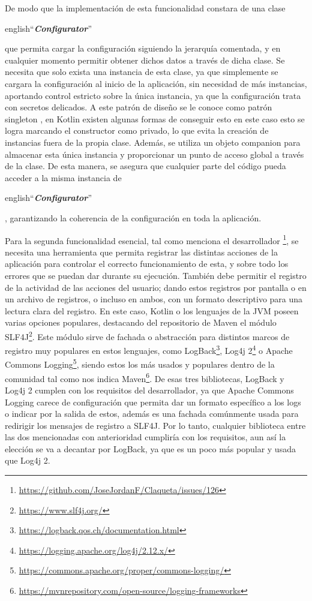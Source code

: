 De modo que la implementación de esta funcionalidad constara de una clase \begin{otherlanguage} {english}``\textit{\textbf{Configurator}}''\end{otherlanguage} 
que permita cargar la configuración siguiendo la jerarquía comentada, y en cualquier momento permitir obtener dichos datos a través 
de dicha clase. Se necesita que solo exista una instancia de esta clase, ya que simplemente se cargara la configuración al inicio de 
la aplicación, sin necesidad de más instancias, aportando control estricto sobre la única instancia, ya que la configuración
trata con secretos delicados. A este patrón de diseño se le conoce como patrón singleton \cite{PattSingl}, en Kotlin 
existen algunas formas de conseguir esto \cite{SinglKotlin} en este caso esto se logra marcando el constructor como 
privado, lo que evita la creación de instancias fuera de la propia clase. Además, se utiliza un objeto companion 
para almacenar esta única instancia y proporcionar un punto de acceso global a través de la clase. De esta manera, 
se asegura que cualquier parte del código pueda acceder a la misma instancia de \begin{otherlanguage} {english}``\textit{\textbf{Configurator}}''\end{otherlanguage}, 
garantizando la coherencia de la configuración en toda la aplicación.

Para la segunda funcionalidad esencial, tal como menciona el desarrollador 
\footnote{\url{https://github.com/JoseJordanF/Claqueta/issues/126}}, se necesita una herramienta que permita 
registrar las distintas acciones de la aplicación para controlar el correcto funcionamiento de esta, y sobre todo 
los errores que se puedan dar durante su ejecución. También debe permitir el registro de la actividad de las 
acciones del usuario; dando estos registros por pantalla o en un archivo de registros, o incluso en ambos, con un 
formato descriptivo para una lectura clara del registro. En este caso, Kotlin o los lenguajes de la JVM poseen 
varias opciones populares, destacando del repositorio de Maven el módulo 
SLF4J\footnote{\url{https://www.slf4j.org/}}. Este módulo sirve de fachada o abstracción para distintos marcos de 
registro muy populares en estos lenguajes, como LogBack\footnote{\url{https://logback.qos.ch/documentation.html}}, 
Log4j 2\footnote{\url{https://logging.apache.org/log4j/2.12.x/}} o Apache Commons 
Logging\footnote{\url{https://commons.apache.org/proper/commons-logging/}}, siendo estos los más usados y populares 
dentro de la comunidad tal como nos indica Maven\footnote{\url{https://mvnrepository.com/open-source/logging-frameworks}}. 
De esas tres bibliotecas, LogBack y Log4j 2 cumplen con los requisitos del desarrollador, ya que Apache Commons 
Logging carece de configuración que permita dar un formato específico a los logs o indicar por la salida de estos, 
además es una fachada comúnmente usada para redirigir los mensajes de registro a SLF4J. Por lo tanto, cualquier 
biblioteca entre las dos mencionadas con anterioridad cumpliría con los requisitos, aun así la elección se va a 
decantar por LogBack, ya que es un poco más popular y usada que Log4j 2.

